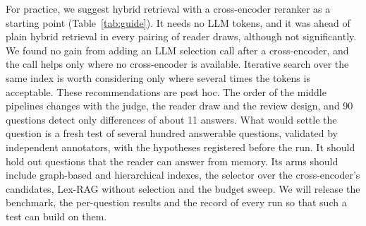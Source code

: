 For practice, we suggest hybrid retrieval with a cross-encoder reranker as a starting point (Table~\ref{tab:guide}). It needs no LLM tokens, and it was ahead of plain hybrid retrieval in every pairing of reader draws, although not significantly. We found no gain from adding an LLM selection call after a cross-encoder, and the call helps only where no cross-encoder is available. Iterative search over the same index is worth considering only where several times the tokens is acceptable. These recommendations are post hoc. The order of the middle pipelines changes with the judge, the reader draw and the review design, and 90 questions detect only differences of about 11 answers. What would settle the question is a fresh test of several hundred answerable questions, validated by independent annotators, with the hypotheses registered before the run. It should hold out questions that the reader can answer from memory. Its arms should include graph-based and hierarchical indexes, the selector over the cross-encoder's candidates, Lex-RAG without selection and the budget sweep. We will release the benchmark, the per-question results and the record of every run so that such a test can build on them.
